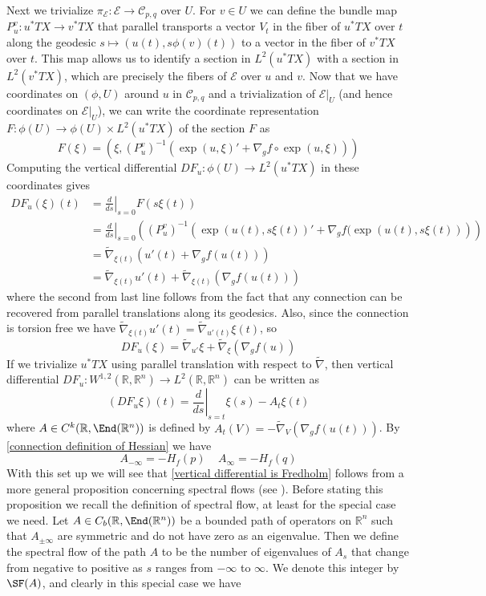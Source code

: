 Next we trivialize $\pi_{\mathcal E} : \mathcal E \rightarrow \mathcal C_{p,q}$ over $U$. For $v \in U$ we can define the bundle map $P_u^v : u^* TX \rightarrow v^* TX$ that parallel transports a vector $V_t$ in the fiber of $u^* TX$ over $t$ along the geodesic $s \mapsto (u(t),s\phi(v)(t))$ to a vector in the fiber of $v^* TX$ over $t$. This map allows us to identify a section in $L^2(u^* TX)$ with a section in $L^2(v^* TX)$, which are precisely the fibers of $\mathcal E$ over $u$ and $v$. Now that we have coordinates on $(\phi,U)$ around $u$ in $\mathcal C_{p,q}$ and a trivialization of $\mathcal E|_U$ (and hence coordinates on $\mathcal E|_U$), we can write the coordinate representation $F : \phi(U) \rightarrow \phi(U) \times L^2(u^* TX)$ of the section $F$ as
\[ F(\xi) = \left( \xi, (P_u^v)^{-1} \left( \exp(u,\xi)' + \nabla_g f \circ \exp(u,\xi) \right) \right) \]
Computing the vertical differential $DF_u : \phi(U) \rightarrow L^2(u^* TX)$ in these coordinates gives
\begin{align*}
DF_u(\xi)(t) &= \left. \frac{d}{ds} \right|_{s=0} F(s\xi(t)) \\
          &= \left. \frac{d}{ds} \right|_{s=0} \left( (P_u^v)^{-1} \left( \exp(u(t),s\xi(t))' + \nabla_g f(\exp(u(t),s\xi(t)) \right) \right) \\
          &= \widetilde\nabla_{\xi(t)} \left( u'(t) + \nabla_g f(u(t)) \right) \\
          &= \widetilde\nabla_{\xi(t)} u'(t) + \widetilde\nabla_{\xi(t)} \left( \nabla_g f(u(t)) \right) 
\end{align*}
where the second from last line follows from the fact that any connection can be recovered from parallel translations along its geodesics. Also, since the connection is torsion free we have $\widetilde\nabla_{\xi(t)}u'(t) = \widetilde\nabla_{u'(t)} \xi(t)$, so
\[ DF_u(\xi) = \widetilde\nabla_{u'} \xi + \widetilde\nabla_\xi \left( \nabla_g f(u) \right) \]
If we trivialize $u^* TX$ using parallel translation with respect to $\widetilde\nabla$, then vertical differential $DF_u : W^{1,2}(\mathbb R,\mathbb R^n) \rightarrow L^2(\mathbb R,\mathbb R^n)$ can be written as
\[ (DF_u \xi)(t) = \left. \frac{d}{ds} \right|_{s=t} \xi(s) - A_t \xi(t) \]
where $A \in C^k(\mathbb R,\End(\mathbb R^n))$ is defined by $A_t(V)=-\widetilde\nabla_V(\nabla_g f(u(t)))$. By \eqref{connection definition of Hessian} we have
\[ A_{-\infty}=-H_f(p) \ \ \ \ \  A_\infty=-H_f(q) \]
With this set up we will see that \cref{vertical differential is Fredholm} follows from a more general proposition concerning spectral flows (see \cite{rs95}). Before stating this proposition we recall the definition of spectral flow, at least for the special case we need. Let $A \in C_b(\mathbb R,\End(\mathbb R^n))$ be a bounded path of operators on $\mathbb R^n$ such that $A_{\pm\infty}$ are symmetric and do not have zero as an eigenvalue. Then we define the spectral flow of the path $A$ to be the number of eigenvalues of $A_s$ that change from negative to positive as $s$ ranges from $-\infty$ to $\infty$. We denote this integer by $\SF(A)$, and clearly in this special case we have
